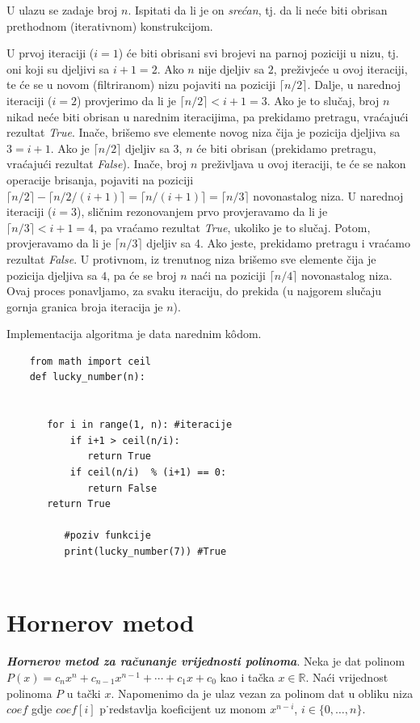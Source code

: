  U ulazu se zadaje broj $n$. Ispitati da li je on \emph{srećan}, tj. da li neće biti obrisan prethodnom (iterativnom) konstrukcijom. 
 
 \begin{solution}
U prvoj iteraciji ($i=1$) će biti obrisani svi brojevi na parnoj poziciji u nizu, tj. oni koji su djeljivi sa $i+1=2$. Ako $n$ nije djeljiv sa $2$, preživjeće u ovoj iteraciji, te će se u novom (filtriranom) nizu pojaviti na poziciji $\lceil n/2 \rceil$. Dalje, u narednoj iteraciji ($i=2$) provjerimo da li je $\lceil n/2 \rceil < i+1=3$. Ako je to slučaj, broj $n$ nikad neće biti obrisan u narednim iteracijima, pa prekidamo pretragu, vraćajući rezultat \emph{True}. Inače, brišemo sve elemente novog niza čija je pozicija djeljiva sa $3=i+1$. Ako je $\lceil n/2 \rceil$ djeljiv sa 3, $n$ će biti obrisan (prekidamo pretragu, vraćajući rezultat \emph{False}). Inače, broj $n$ preživljava u ovoj iteraciji, te će se nakon operacije brisanja, pojaviti na poziciji $\lceil n/2 \rceil - \lceil n/2 /(i+1)\rceil = \lceil n/(i+1) \rceil = \lceil n/3 \rceil$ novonastalog niza. U narednoj iteraciji ($i=3$), sličnim rezonovanjem prvo provjeravamo da li je $\lceil n/3 \rceil < i+1=4$, pa vraćamo rezultat \emph{True}, ukoliko je to slučaj. Potom, provjeravamo da li je
 $\lceil n/3 \rceil$ djeljiv sa 4. Ako jeste, prekidamo pretragu i vraćamo rezultat \emph{False}. U protivnom, iz trenutnog niza brišemo sve elemente čija je pozicija djeljiva sa $4$, pa će se broj $n$ naći na poziciji $\lceil n/4 \rceil$ novonastalog niza. Ovaj proces ponavljamo, za svaku iteraciju, do prekida (u najgorem slučaju gornja granica broja iteracija je $n$).  
 
 
 Implementacija algoritma je data narednim k\^odom. 
 
 \begin{verbatim}
 	from math import ceil
 	def lucky_number(n):
 
 	      
 	   for i in range(1, n): #iteracije
 	       if i+1 > ceil(n/i):
 	          return True 
 	       if ceil(n/i)  % (i+1) == 0:
 	          return False
 	   return True       
    
          #poziv funkcije
          print(lucky_number(7)) #True	       
  
 \end{verbatim}
  
 \end{solution}
 
 \section{Hornerov metod}
\begin{definition}
	\textbf{\textit{Hornerov metod za računanje vrijednosti polinoma}}. Neka je dat polinom $P(x)=c_n x^n + c_{n-1}x^{n-1} + \cdots + c_1 x + c_0$ kao i tačka $x \in \mathbb{R}$. Naći vrijednost polinoma $P$ u tački $x$. Napomenimo da je ulaz vezan za polinom dat u obliku niza $ coef$ gdje   $coef[i]$ p˙redstavlja koeficijent uz monom  $x^{n-i}$, $i \in \{0, \ldots, n\}$. 

\end{definition}

